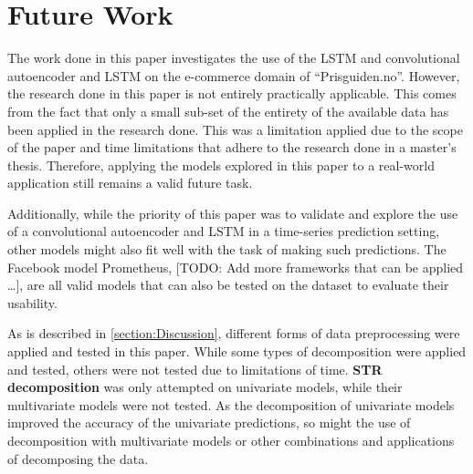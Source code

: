 
\section{Future Work}
\label{sections:Discussion:FutureWork}


The work done in this paper investigates the use of the LSTM and convolutional autoencoder and LSTM
on the e-commerce domain of ``Prisguiden.no''.
However, the research done in this paper is not entirely practically applicable.
This comes from the fact that only a small sub-set of the entirety of the available data has been applied
in the research done.
This was a limitation applied due to the scope of the paper and time limitations that adhere to the research done in a master's thesis.
Therefore, applying the models explored in this paper to a real-world application still remains a valid future task.

Additionally, while the priority of this paper was to validate and explore the use of a convolutional autoencoder and LSTM
in a time-series prediction setting, other models might also fit well with the task of making such predictions.
The Facebook model Prometheus, [TODO: Add more frameworks that can be applied \dots ],
are all valid models that can also be tested on the dataset to evaluate their usability.


As is described in \cref{section:Discussion}, different forms of data preprocessing were applied and tested in this paper.
While some types of decomposition were applied and tested, others were not tested due to limitations of time.
\textbf{STR decomposition} was only attempted on univariate models, while their multivariate models were not tested.
As the decomposition of univariate models improved the accuracy of the univariate predictions,
so might the use of decomposition with multivariate models or other combinations and applications of decomposing the data.


